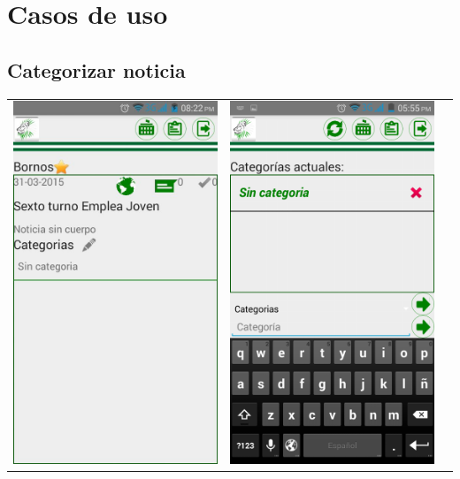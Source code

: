 \section{Casos de uso}
\subsection{Categorizar noticia}

\begin{tabular}{p{7cm}p{8mm}p{7cm}}

\includegraphics[width=6.5cm]{./android/imagenes/cat1.jpg}

&

\includegraphics[width=6.5cm]{./android/imagenes/cat2.png}


\end{tabular}
